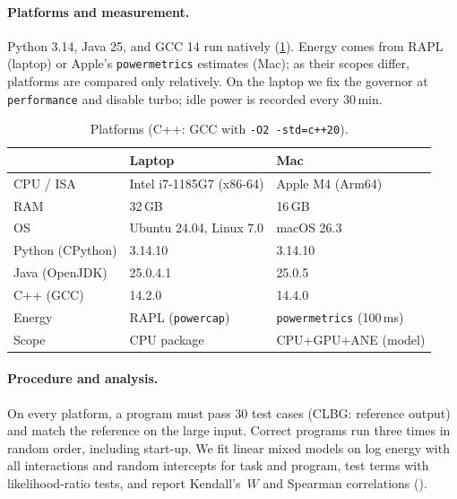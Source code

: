 \paragraph{Platforms and measurement.}
Python 3.14, Java 25, and GCC 14 run natively (\cref{tab:platforms}). Energy comes from
RAPL~\cite{raffin2024rapl} (laptop) or Apple's \texttt{powermetrics} estimates (Mac); as
their scopes differ, platforms are compared only relatively. On the laptop we fix the
governor at \texttt{performance} and disable turbo; idle power is recorded every
30\,min.

\begin{table}[t]
  \centering
  \caption{Platforms (C++: GCC with \texttt{-O2 -std=c++20}).}
  \label{tab:platforms}
  \footnotesize
  \setlength{\tabcolsep}{4pt}
  \begin{tabular}{@{}lll@{}}
    \toprule
    & Laptop & Mac \\
    \midrule
    CPU / ISA       & Intel i7-1185G7 (x86-64) & Apple M4 (Arm64) \\
    RAM             & 32\,GB & 16\,GB \\
    OS              & Ubuntu 24.04, Linux 7.0 & macOS 26.3 \\
    Python (CPython) & 3.14.10 & 3.14.10 \\
    Java (OpenJDK)  & 25.0.4.1 & 25.0.5 \\
    C++ (GCC)       & 14.2.0 & 14.4.0 \\
    Energy          & RAPL (\texttt{powercap}) & \texttt{powermetrics} (100\,ms) \\
    Scope           & CPU package & CPU+GPU+ANE (model) \\
    \bottomrule
  \end{tabular}
\end{table}

\paragraph{Procedure and analysis.}
On every platform, a program must pass 30 test cases (CLBG: reference output) and match the
reference on the large input. Correct programs run three times in random order, including
start-up. We fit linear mixed models on log energy with all interactions
and random intercepts for task and program, test terms with likelihood-ratio tests, and report Kendall's~$W$ and Spearman correlations ().
